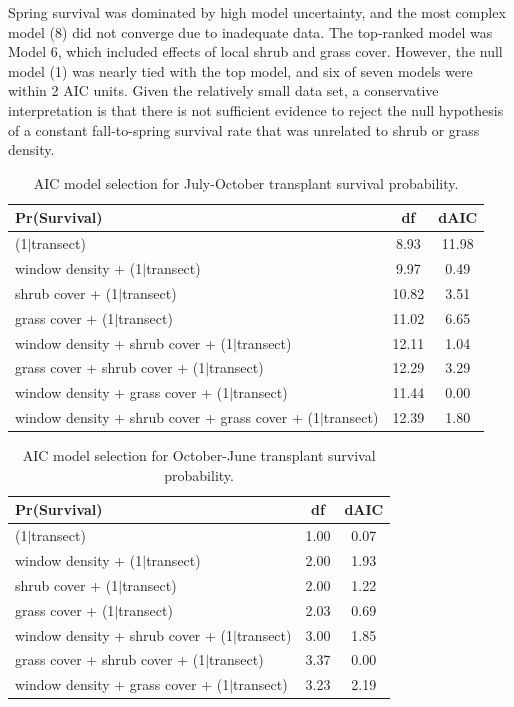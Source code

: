 \documentclass[11pt]{article}\usepackage[]{graphicx}\usepackage[usenames,dvipsnames]{xcolor}
\begin{document}
Spring survival was dominated by high model uncertainty, and the most complex model (8) did not converge due to inadequate data. 
The top-ranked model was Model 6, which included effects of local shrub and grass cover.
However, the null model (1) was nearly tied with the top model, and six of seven models were within 2 AIC units. 
Given the relatively small data set, a conservative interpretation is that there is not sufficient evidence to reject the null hypothesis of a constant fall-to-spring survival rate that was unrelated to shrub or grass density. 

\begin{table}[ht]
\centering
\begin{tabular}{|p{12cm}|c|c|}
  \hline
Pr(Survival) & df & dAIC \\ 
  \hline
(1$|$transect) & 8.93 & 11.98 \\ 
  window density + (1$|$transect) & 9.97 & 0.49 \\ 
  shrub cover + (1$|$transect) & 10.82 & 3.51 \\ 
  grass cover + (1$|$transect) & 11.02 & 6.65 \\ 
  window density + shrub cover + (1$|$transect) & 12.11 & 1.04 \\ 
  grass cover + shrub cover + (1$|$transect) & 12.29 & 3.29 \\ 
  window density + grass cover + (1$|$transect) & 11.44 & 0.00 \\ 
  window density + shrub cover + grass cover + (1$|$transect) & 12.39 & 1.80 \\ 
   \hline
\end{tabular}
\caption{AIC model selection for July-October transplant survival probability.} 
\label{tab:fall_aic}
\end{table}


\begin{table}[ht]
\centering
\begin{tabular}{|p{12cm}|c|c|}
  \hline
Pr(Survival) & df & dAIC \\ 
  \hline
(1$|$transect) & 1.00 & 0.07 \\ 
  window density + (1$|$transect) & 2.00 & 1.93 \\ 
  shrub cover + (1$|$transect) & 2.00 & 1.22 \\ 
  grass cover + (1$|$transect) & 2.03 & 0.69 \\ 
  window density + shrub cover + (1$|$transect) & 3.00 & 1.85 \\ 
  grass cover + shrub cover + (1$|$transect) & 3.37 & 0.00 \\ 
  window density + grass cover + (1$|$transect) & 3.23 & 2.19 \\ 
   \hline
\end{tabular}
\caption{AIC model selection for October-June transplant survival probability.} 
\label{tab:spring_aic}
\end{table}
\end{document}
